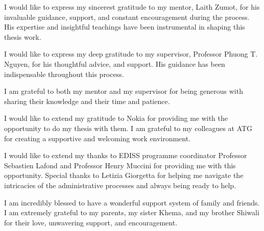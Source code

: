 \documentclass[
11pt, %
english, %
singlespacing, %
headsepline, %
]{MastersDoctoralThesis} %
\begin{document}
\begin{acknowledgements}
\addchaptertocentry{\acknowledgementname} %
I would like to express my sincerest gratitude to my mentor, Laith Zumot, for his invaluable guidance, support, and constant encouragement during the process. His expertise and insightful teachings have been instrumental in shaping this thesis work. 

I would like to express my deep gratitude to my supervisor, Professor Phuong T. Nguyen, for his thoughtful advice, and support. His guidance has been indispensable throughout this process.

I am grateful to both my mentor and my supervisor for being generous with sharing their knowledge and their time and patience.

I would like to extend my gratitude to Nokia for providing me with the opportunity to do my thesis with them. I am grateful to my colleagues at ATG for creating a supportive and welcoming work environment.

I would like to extend my thanks to EDISS programme coordinator Professor Sebastien Lafond and Professor Henry Muccini for providing me with this opportunity. Special thanks to Letizia Giorgetta for helping me navigate the intricacies of the administrative processes and always being ready to help.

I am incredibly blessed to have a wonderful support system of family and friends. I am extremely grateful to my parents, my sister Khema, and my brother Shiwali for their love, unwavering support, and encouragement. 


\end{acknowledgements}


\tableofcontents %

\listoffigures %

\listoftables %

\end{document}
